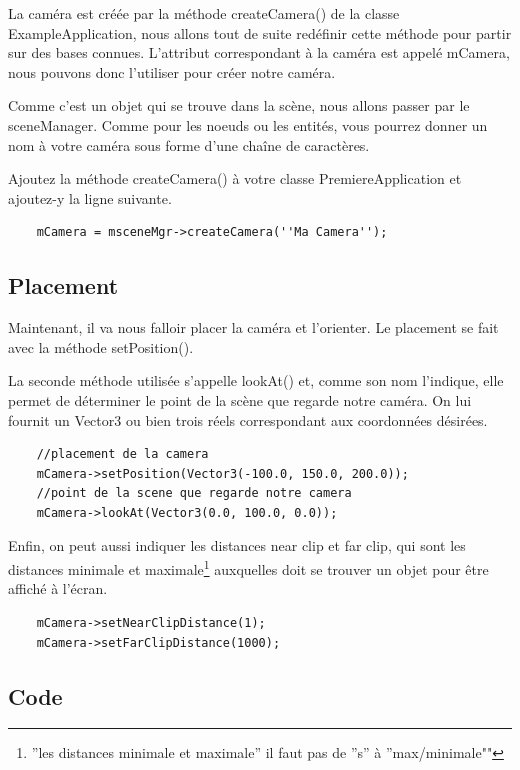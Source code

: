 La caméra est créée par la méthode  createCamera() de la classe ExampleApplication, nous allons tout de suite redéfinir cette méthode pour partir sur des bases connues. L'attribut correspondant à la caméra est appelé mCamera, nous pouvons donc l'utiliser pour créer notre caméra.

Comme c'est un objet qui se trouve dans la scène, nous allons passer par le sceneManager. Comme pour les noeuds ou les entités, vous pourrez donner un nom à votre caméra sous forme d'une cha\^ine de caractères.

Ajoutez la méthode createCamera() à votre classe PremiereApplication et ajoutez-y la ligne suivante.

\begin{lstlisting}
	mCamera = msceneMgr->createCamera(''Ma Camera'');
\end{lstlisting}





\subsection{Placement}

Maintenant, il va nous falloir placer la caméra et l'orienter. Le placement se fait avec la méthode setPosition(). 

La seconde méthode utilisée s'appelle lookAt() et, comme son nom l'indique, elle permet de déterminer le point de la scène que regarde notre caméra. On lui fournit un Vector3 ou bien trois réels correspondant aux coordonnées désirées.

\begin{lstlisting}
	//placement de la camera
	mCamera->setPosition(Vector3(-100.0, 150.0, 200.0));
	//point de la scene que regarde notre camera
	mCamera->lookAt(Vector3(0.0, 100.0, 0.0));
\end{lstlisting}


Enfin, on peut aussi indiquer les distances near clip et far clip, qui sont les distances minimale et maximale\footnote{''les distances minimale et maximale'' il faut pas de ''s'' à ''max/minimale""} auxquelles doit se trouver un objet pour être affiché à l'écran.
\begin{lstlisting}
	mCamera->setNearClipDistance(1);
	mCamera->setFarClipDistance(1000);
\end{lstlisting}




\subsection{Code}

